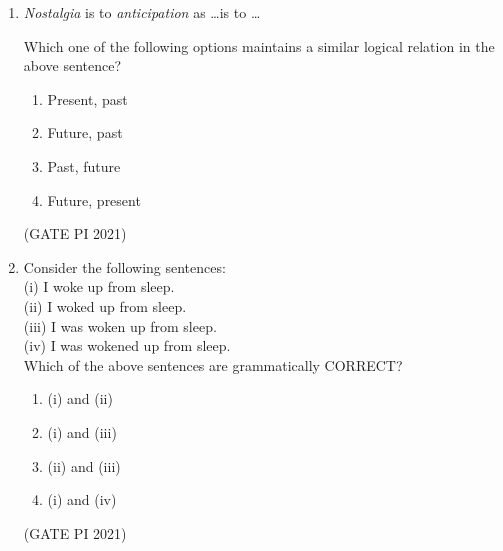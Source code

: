 \documentclass[journal,12pt,onecolumn]{IEEEtran}
\theoremstyle{remark}
\begin{document}
\begin{enumerate}
\begin{multicols}{4}
\begin{enumerate}
\item 4
\item 3
\item 6
\item 7
\end{enumerate}
\end{multicols}
\hfill (GATE PI 2021)

\item \textit{Nostalgia} is to \textit{anticipation} as \ldots is to \ldots

Which one of the following options maintains a similar logical relation in the above sentence?
\begin{multicols}{4}
\begin{enumerate}
\item Present, past
\item Future, past
\item Past, future
\item Future, present
\end{enumerate}
\end{multicols}
\hfill (GATE PI 2021)

\item Consider the following sentences:\\
(i)  I woke up from sleep.\\
(ii)  I woked up from sleep.\\
(iii) I was woken up from sleep.\\
(iv) I was wokened up from sleep.\\
Which of the above sentences are grammatically CORRECT?
\begin{multicols}{4}
\begin{enumerate}
\item (i) and (ii)
\item (i) and (iii)
\item (ii) and (iii)
\item (i) and (iv)
\end{enumerate}
\end{multicols}

\hfill (GATE PI 2021)



\end{enumerate}
\end{document}
